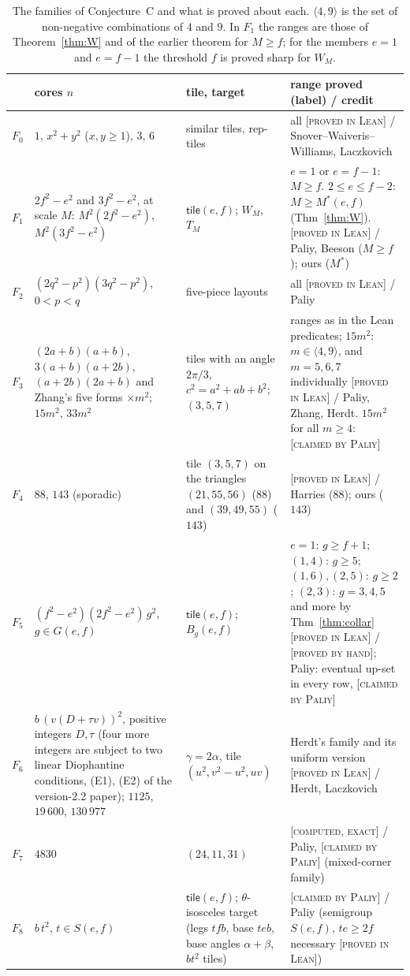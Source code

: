 \documentclass[11pt,reqno]{amsart}
\theoremstyle{plain}
\theoremstyle{definition}
\newcommand{\lab}[1]{\textup{[\textsc{#1}]}}
\newcommand{\PL}{\lab{proved in Lean}}
\newcommand{\PH}{\lab{proved by hand}}
\newcommand{\CE}{\lab{computed, exact}}
\newcommand{\CP}{\lab{claimed by Paliy}}
\newcommand{\tile}{\mathsf{tile}}
\begin{document}
\begin{table}[ht]
\small
\renewcommand{\arraystretch}{1.15}
\begin{tabular}{@{}p{0.55cm}p{3.2cm}p{3.3cm}p{5.1cm}@{}}
\toprule
 & cores $n$ & tile, target & range proved \quad (label) / credit\\
\midrule
$F_0$ & $1$, $x^2+y^2$ ($x,y\ge1$), $3$, $6$ & similar tiles, rep-tiles & all \quad \PL{} / Snover--Waiveris--Williams, Laczkovich\\
$F_1$ & $2f^2-e^2$ and $3f^2-e^2$, at scale $M$: $M^2(2f^2-e^2)$, $M^2(3f^2-e^2)$ & $\tile(e,f)$; $W_M$, $T_M$ & $e=1$ or $e=f-1$: $M\ge f$. $2\le e\le f-2$: $M\ge M^*(e,f)$ (Thm~\ref{thm:W}). \quad \PL{} / Paliy, Beeson ($M\ge f$); ours ($M^*$)\\
$F_2$ & $(2q^2-p^2)(3q^2-p^2)$, $0<p<q$ & five-piece layouts & all \quad \PL{} / Paliy\\
$F_3$ & $(2a+b)(a+b)$, $3(a+b)(a+2b)$, $(a+2b)(2a+b)$ and Zhang's five forms $\times m^2$; $15m^2$, $33m^2$ & tiles with an angle $2\pi/3$, $c^2=a^2+ab+b^2$; $(3,5,7)$ & ranges as in the Lean predicates; $15m^2$: $m\in\langle4,9\rangle$, and $m=5,6,7$ individually \quad \PL{} / Paliy, Zhang, Herdt. $15m^2$ for all $m\ge4$: \CP{}\\
$F_4$ & $88$, $143$ (sporadic) & tile $(3,5,7)$ on the triangles $(21,55,56)$ ($88$) and $(39,49,55)$ ($143$) & \PL{} / Harries ($88$); ours ($143$)\\
$F_5$ & $(f^2-e^2)(2f^2-e^2)\,g^2$, $g\in G(e,f)$ & $\tile(e,f)$; $B_g(e,f)$ & $e=1$: $g\ge f+1$; $(1,4)$: $g\ge5$; $(1,6),(2,5)$: $g\ge2$; $(2,3)$: $g=3,4,5$ and more by Thm~\ref{thm:collar} \quad \PL{} / \PH{}; Paliy: eventual up-set in every row, \CP{}\\
$F_6$ & $b\,(v(D+\tau v))^2$, positive integers $D,\tau$ (four more integers are subject to two linear Diophantine conditions, (E1), (E2) of the version-2.2 paper); $1125$, $19\,600$, $130\,977$ & $\gamma=2\alpha$, tile $(u^2,v^2-u^2,uv)$ & Herdt's family and its uniform version \quad \PL{} / Herdt, Laczkovich\\
$F_7$ & $4830$ & $(24,11,31)$ & \CE{} / Paliy, \CP{} (mixed-corner family)\\
$F_8$ & $b\,t^2$, $t\in S(e,f)$ & $\tile(e,f)$; $\theta$-isosceles target (legs $tfb$, base $teb$, base angles $\alpha+\beta$, $bt^2$ tiles) & \CP{} / Paliy (semigroup $S(e,f)$, $te\ge2f$ necessary \PL{})\\
\bottomrule
\end{tabular}
\caption{The families of Conjecture~C and what is proved about each. $\langle4,9\rangle$ is the set of non-negative combinations of $4$ and $9$. In $F_1$ the ranges are those of Theorem~\ref{thm:W} and of the earlier theorem for $M\ge f$; for the members $e=1$ and $e=f-1$ the threshold $f$ is proved sharp for $W_M$.}\label{tab:families}
\end{table}
\end{document}
